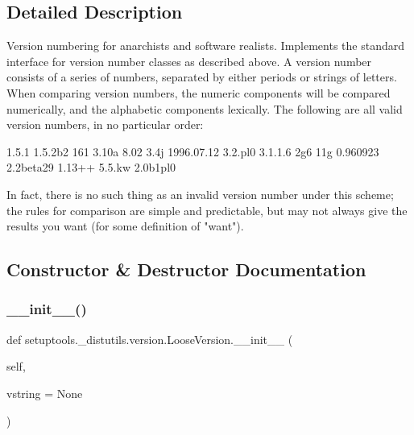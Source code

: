 \subsection{Detailed Description}
\begin{DoxyVerb}Version numbering for anarchists and software realists.
Implements the standard interface for version number classes as
described above.  A version number consists of a series of numbers,
separated by either periods or strings of letters.  When comparing
version numbers, the numeric components will be compared
numerically, and the alphabetic components lexically.  The following
are all valid version numbers, in no particular order:

    1.5.1
    1.5.2b2
    161
    3.10a
    8.02
    3.4j
    1996.07.12
    3.2.pl0
    3.1.1.6
    2g6
    11g
    0.960923
    2.2beta29
    1.13++
    5.5.kw
    2.0b1pl0

In fact, there is no such thing as an invalid version number under
this scheme; the rules for comparison are simple and predictable,
but may not always give the results you want (for some definition
of "want").
\end{DoxyVerb}
 

\subsection{Constructor \& Destructor Documentation}
\mbox{\label{classsetuptools_1_1__distutils_1_1version_1_1LooseVersion_a07dc312ca7cc0b5fcbdc615ad76a5eea}} 
\subsubsection{\texorpdfstring{\+\_\+\+\_\+init\+\_\+\+\_\+()}{\_\_init\_\_()}}
{\footnotesize\ttfamily def setuptools.\+\_\+distutils.\+version.\+Loose\+Version.\+\_\+\+\_\+init\+\_\+\+\_\+ (\begin{DoxyParamCaption}\item[{}]{self,  }\item[{}]{vstring = {\ttfamily None} }\end{DoxyParamCaption})}



